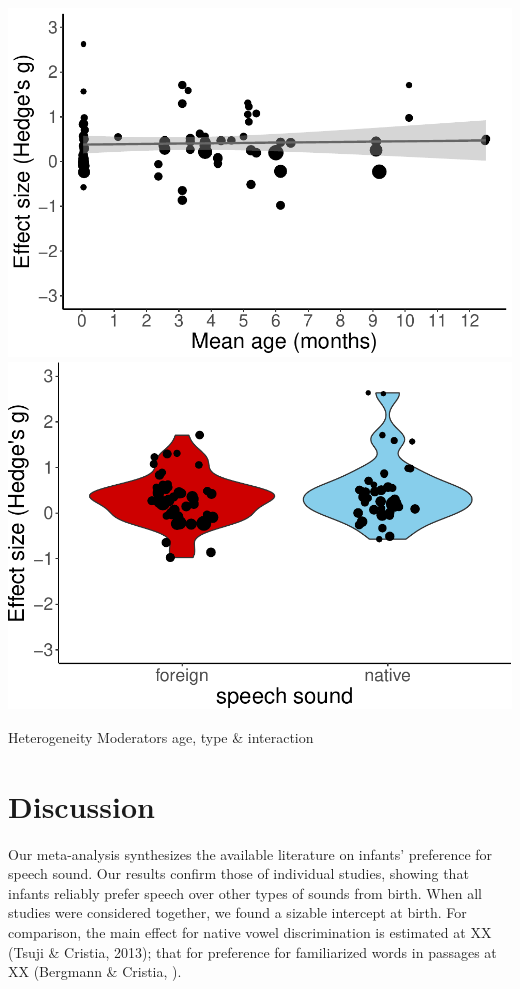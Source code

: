 \documentclass[]{apa6}
\begin{document}
\includegraphics{MA_speech_pref_files/figure-latex/plots-4.pdf}
\includegraphics{MA_speech_pref_files/figure-latex/plots-5.pdf}

Heterogeneity Moderators age, type \& interaction

\section{Discussion}\label{discussion}

Our meta-analysis synthesizes the available literature on infants'
preference for speech sound. Our results confirm those of individual
studies, showing that infants reliably prefer speech over other types of
sounds from birth. When all studies were considered together, we found a
sizable intercept at birth. For comparison, the main effect for native
vowel discrimination is estimated at XX (Tsuji \& Cristia, 2013); that
for preference for familiarized words in passages at XX (Bergmann \&
Cristia, ).
\end{document}
